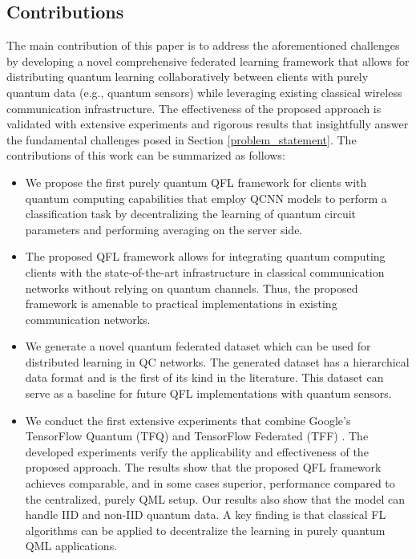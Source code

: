 \documentclass{article}
\begin{document}
\subsection{Contributions}
The main contribution of this paper is to address the aforementioned challenges by developing a novel comprehensive federated learning framework that allows for distributing quantum learning collaboratively between clients with purely quantum data (e.g., quantum sensors) while leveraging existing classical wireless communication infrastructure. The effectiveness of the proposed approach is validated with extensive experiments and rigorous results that insightfully answer the fundamental challenges posed in Section \ref{problem_statement}. The contributions of this work can be summarized as follows:
\begin{itemize}
    \item We propose the first purely quantum QFL framework for clients with quantum computing capabilities that employ QCNN models to perform a classification task by decentralizing the learning of quantum circuit parameters and performing averaging on the server side.
    
    \item The proposed QFL framework allows for integrating quantum computing clients with the state-of-the-art infrastructure in classical communication networks without relying on quantum channels. Thus, the proposed framework is amenable to practical implementations in existing communication networks.
    
    \item We generate a novel quantum federated dataset which can be used for distributed learning in QC networks. The generated dataset has a hierarchical data format and is the first of its kind in the literature. This dataset can serve as a baseline for future QFL implementations with quantum sensors.
    
    
    \item We conduct the first extensive experiments that combine Google's TensorFlow Quantum (TFQ) \cite{tensorflow_quantum} and TensorFlow Federated (TFF) \cite{TFF}. The developed experiments verify the applicability and effectiveness of the proposed approach. The results show that the proposed QFL framework achieves comparable, and in some cases superior, performance compared to the centralized, purely QML setup. Our results also show that the model can handle IID and non-IID quantum data. A key finding is that classical FL algorithms can be applied to decentralize the learning in purely quantum QML applications.

\end{itemize}
\end{document}
